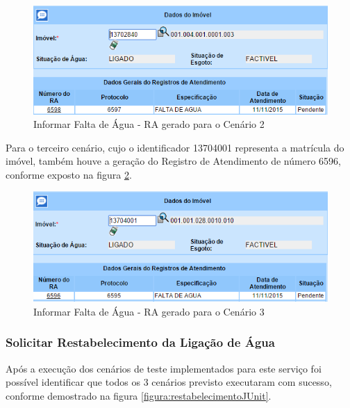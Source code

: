 	\begin{figure}[H]
		\centering
		\caption{Informar Falta de Água - RA gerado para o Cenário 2}
		\label{figura:informarFaltaRA2}
		\includegraphics{figuras/cenarios/informar_falta_agua/resultado_2.PNG}
	\end{figure}

Para o terceiro cenário, cujo o identificador 13704001 representa a matrícula do imóvel, também houve a geração do Registro de Atendimento de número 6596, conforme exposto na figura \ref{figura:informarFaltaRA3}.	

\begin{figure}[H]
	\centering
	\caption{Informar Falta de Água - RA gerado para o Cenário 3}
	\label{figura:informarFaltaRA3}
	\includegraphics{figuras/cenarios/informar_falta_agua/resultado_3.PNG}
\end{figure}	

		
\subsubsection{Solicitar Restabelecimento da Ligação de Água}

 Após a execução dos cenários de teste implementados para este serviço foi possível identificar que todos os 3 cenários previsto executaram com sucesso, conforme demostrado na figura \ref{figura:restabelecimentoJUnit}.	

